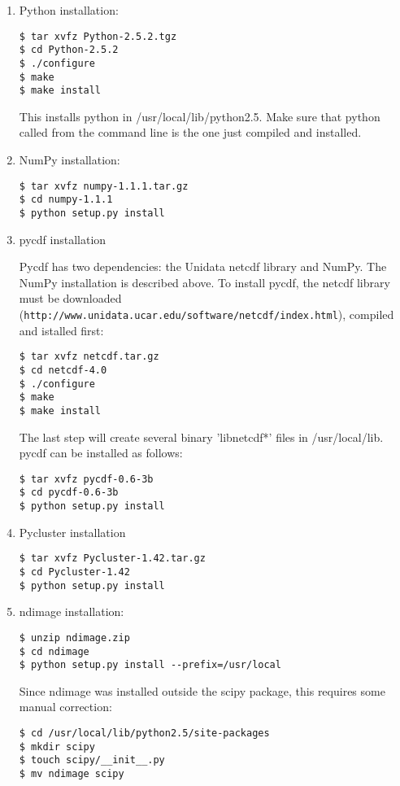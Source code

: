 \begin{enumerate}

\item Python installation:

\begin{verbatim}
$ tar xvfz Python-2.5.2.tgz
$ cd Python-2.5.2
$ ./configure
$ make
$ make install
\end{verbatim}

\noindent
This installs python in /usr/local/lib/python2.5.  Make sure that python called
from the command line is the one just compiled and installed.

\item NumPy installation:

\begin{verbatim}
$ tar xvfz numpy-1.1.1.tar.gz
$ cd numpy-1.1.1
$ python setup.py install
\end{verbatim}

\item pycdf installation

Pycdf has two dependencies: the Unidata netcdf library and NumPy. The NumPy
installation is described above. To install pycdf, the netcdf library must
be downloaded ({\tt http://www.unidata.ucar.edu/software/netcdf/index.html}),
compiled and istalled first:

\begin{verbatim}
$ tar xvfz netcdf.tar.gz
$ cd netcdf-4.0
$ ./configure
$ make
$ make install
\end{verbatim}

The last step will create several binary 'libnetcdf*' files in /usr/local/lib.
pycdf can be installed as follows:

\begin{verbatim}
$ tar xvfz pycdf-0.6-3b
$ cd pycdf-0.6-3b
$ python setup.py install
\end{verbatim}

\item Pycluster installation

\begin{verbatim}
$ tar xvfz Pycluster-1.42.tar.gz
$ cd Pycluster-1.42
$ python setup.py install
\end{verbatim}

\item ndimage installation:

\begin{verbatim}
$ unzip ndimage.zip
$ cd ndimage
$ python setup.py install --prefix=/usr/local
\end{verbatim}

\noindent
Since ndimage was installed outside the scipy package, this requires some manual
correction:

\begin{verbatim}
$ cd /usr/local/lib/python2.5/site-packages
$ mkdir scipy
$ touch scipy/__init__.py
$ mv ndimage scipy
\end{verbatim}

\end{enumerate}

